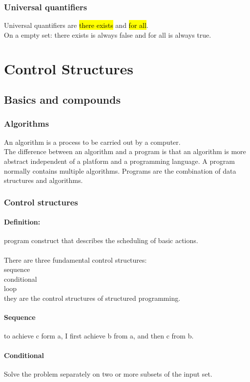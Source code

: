 \documentclass[11pt]{article}
\newcommand\tab[1][1cm]{\hspace*{#1}}
\begin{document}
\subsubsection{Universal quantifiers}
Universal quantifiers are \hl{there exists} and \hl{for all}.\\On a empty set: there exists is always false and for all is always true.
\section{Control Structures}
\subsection{Basics and compounds}
\subsubsection{Algorithms}
An algorithm is a process to be carried out by a computer.\\ The difference between an algorithm and a program is that an algorithm is more abstract independent of a platform and a programming language. A program normally contains multiple algorithms. Programs are the combination of data structures and algorithms.
\subsubsection{Control structures}
\paragraph{Definition:}
 program construct that describes the scheduling of basic actions.\\\\There are three fundamental control structures: \\\tab sequence\\\tab conditional\\\tab loop\\they are the control structures of structured programming.
\paragraph{Sequence}
to achieve c form a, I first achieve b from a, and then c from b.
\paragraph{Conditional}
Solve the problem separately on two or more subsets of the input set.
\end{document}
